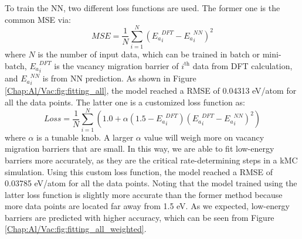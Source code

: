 To train the \ac{NN}, two different loss functions are used. The former one is the common \acf{MSE} via:
\begin{equation}
MSE = \frac{1}{N}\sum_{i=1}^{N}({E_a}_{i}^{DFT} - {E_a}_{i}^{NN})^2
\label{Chap:Al/Vac:eq:MSE}
\end{equation}
where $N$ is the number of input data, which can be trained in batch or mini-batch, ${E_a}_i^{DFT}$ is the vacancy migration barrier of $i^{\text{th}}$ data from \ac{DFT} calculation, and ${E_a}_{i}^{NN}$ is from \ac{NN} prediction. As shown in Figure \ref{Chap:Al/Vac:fig:fitting_all}, the model reached a \ac{RMSE} of 0.04313 eV/atom for all the data points. The latter one is a customized loss function as:
\begin{equation}
Loss = \frac{1}{N}\sum_{i=1}^{N}{(1.0 + \alpha (1.5 - {E_a}_{i}^{DFT})({E_a}_{i}^{DFT} - {E_a}_{i}^{NN})^2)}
\label{Chap:Al/Vac:eq:custLoss}
\end{equation}
where $\alpha$ is a tunable knob. A larger $\alpha$ value will weigh more on vacancy migration barriers that are small. In this way, we are able to fit low-energy barriers more accurately, as they are the critical rate-determining steps in a \ac{kMC} simulation. Using this custom loss function, the model reached a \ac{RMSE} of 0.03785 eV/atom for all the data points. Noting that the model trained using the latter loss function is slightly more accurate than the former method because more data points are located far away from 1.5 eV. As we expected, low-energy barriers are predicted with higher accuracy, which can be seen from Figure \ref{Chap:Al/Vac:fig:fitting_all_weighted}.